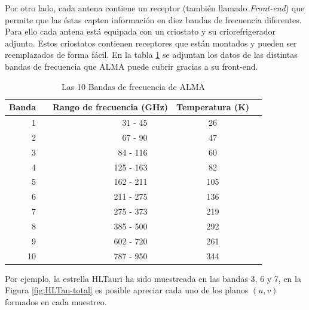 \clearpage

Por otro lado, cada antena contiene un receptor (también llamado \textit{Front-end}) que permite que las éstas capten información en diez bandas de frecuencia diferentes. Para ello cada antena está equipada con un criostato y su criorefrigerador adjunto. Estos criostatos contienen receptores que están montados y pueden ser reemplazados de forma fácil. En la tabla \ref{tab:bands} se adjuntan los datos de las distintas bandas de frecuencia que ALMA puede cubrir gracias a su front-end.


\begin{table}[h!]
\centering
{}
\begin{tabular}{@{}rcrrcr@{}}
\toprule
 \multicolumn{1}{c}{{\bf Banda}} & \phantom{a} & \multicolumn{2}{c}{{\bf Rango de frecuencia (GHz)}}  & \multicolumn{1}{c}{{\bf Temperatura (K)}} \\
 \midrule
 1   && 31 - 45 &&  26\\
 2   && 67 - 90 &&  47\\
 3  && 84 - 116 &&  60\\
 4  && 125 - 163 &&  82\\
 5  && 162 - 211 &&  105\\
 6  && 211 - 275 &&  136\\
 7  && 275 - 373 &&  219\\
 8  && 385 - 500 &&  292\\
 9  && 602 - 720 &&  261\\
 10  && 787 - 950 &&  344\\
 \toprule
\end{tabular}
\caption{Las 10 Bandas de frecuencia de ALMA}
\label{tab:bands}
\end{table}

Por ejemplo, la estrella HLTauri ha sido muestreada en las bandas 3, 6 y 7, en la Figura \ref{fig:HLTau-total} es posible apreciar cada uno de los planos $(u,v)$ formados en cada muestreo.


